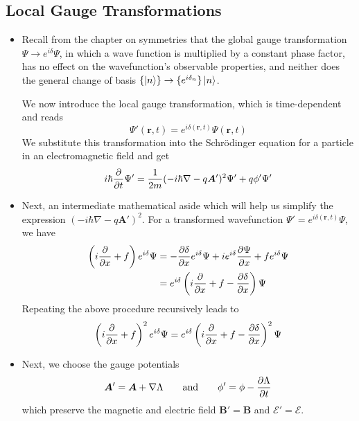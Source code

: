 \documentclass[11pt, a4paper]{article}
\renewcommand{\grad}{\nabla}
\newcommand{\eqtext}[1]{\qquad \text{#1} \qquad}
\newcommand{\Schro}{Schr\"{o}dinger\xspace}
\renewcommand{\vec}[1]{\bm{#1}}  %
\renewcommand{\r}{\vec{r}}  %
\newcommand{\A}{\vec{A}}  %
\newcommand{\B}{\vec{B}}  %
\renewcommand{\P}{\Psi}  %
\begin{document}
\subsection{Local Gauge Transformations}
\begin{itemize}
	\item Recall from the chapter on symmetries that the global gauge transformation $ \P \to e^{i\delta}\P $, in which a wave function is multiplied by a constant phase factor, has no effect on the wavefunction's observable properties, and neither does the general change of basis $ \{\ket{n}\} \to \{e^{i\delta_{n}}\}\ket{n}$. 
	
	We now introduce the local gauge transformation, which is time-dependent and reads
	\begin{equation*}
		\P'(\r, t) = e^{i\delta (\r, t)} \P(\r, t)
	\end{equation*}
	We substitute this transformation into the \Schro equation for a particle in an electromagnetic field and get
	\begin{equation*}
		i\hbar \pdv{t}\P' = \frac{1}{2m}(-i\hbar \grad - q\A')^{2}\P' + q \phi' \P'
	\end{equation*}
	
	\item Next, an intermediate mathematical aside which will help us simplify the expression $ (-i\hbar \grad - q\A')^{2} $. For a transformed wavefunction $ \P' = e^{i\delta(\r, t)}\P $, we have
	\begin{align*}
		\left(i\pdv{x} + f\right)e^{i\delta}\P &= - \pdv{\delta}{x} e^{i\delta }\P + ie^{i\delta}\pdv{\P}{x} + fe^{i\delta}\P\\
		& = e^{i\delta}\left(i \pdv{x} + f - \pdv{\delta}{x}\right)\P \\
	\end{align*}
	Repeating the above procedure recursively leads to
	\begin{equation*}
		\left(i\pdv{x} + f\right)^{2}e^{i\delta}\P = e^{i\delta}\left(i \pdv{x} + f - \pdv{\delta}{x}\right)^{2}\P 
	\end{equation*}
	
	\item Next, we choose the gauge potentials
	\begin{equation*}
		\A' = \A + \grad \Lambda \eqtext{and} \phi' = \phi - \pdv{\Lambda}{t}
	\end{equation*}
	which preserve the magnetic and electric field $ \B' = \B $ and $ \vec{\mathcal{E}}' = \vec{\mathcal{E}} $.
	

\end{itemize}
\end{document}
